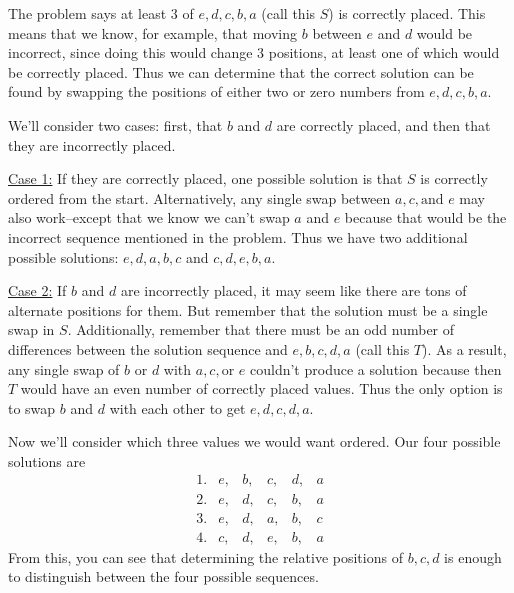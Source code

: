 \begin{solution}[C]
    The problem says at least $3$ of $e, d, c, b, a$ (call this $S$) is correctly placed. This means that we know, for example, that moving $b$ between $e$ and $d$ would be incorrect, since doing this would change 3 positions, at least one of which would be correctly placed. Thus we can determine that the correct solution can be found by swapping the positions of either two or zero numbers from $e, d, c, b, a$.

    We'll consider two cases: first, that $b$ and $d$ are correctly placed, and then that they are incorrectly placed.

    \underline{Case 1:} If they are correctly placed, one possible solution is that $S$ is correctly ordered from the start. Alternatively, any single swap between $a, c, \text{and } e$ may also work--except that we know we can't swap $a$ and $e$ because that would be the incorrect sequence mentioned in the problem. Thus we have two additional possible solutions: $e, d, a, b, c$ and $c, d, e, b, a$.

    \underline{Case 2:} If $b$ and $d$ are incorrectly placed, it may seem like there are tons of alternate positions for them. But remember that the solution must be a single swap in $S$. Additionally, remember that there must be an odd number of differences between the solution sequence and $e, b, c, d, a$ (call this $T$). As a result, any single swap of $b$ or $d$ with $a, c, \text{or } e$ couldn't produce a solution because then $T$ would have an even number of correctly placed values. Thus the only option is to swap $b$ and $d$ with each other to get $e, d, c, d, a$.

    Now we'll consider which three values we would want ordered. Our four possible solutions are 
    \[
    \begin{array}{cccccc}
    1. & e, & b, & c, & d, & a \\[1mm]
    2. & e, & d, & c, & b, & a \\[1mm]
    3. & e, & d, & a, & b, & c \\[1mm]
    4. & c, & d, & e, & b, & a
    \end{array}
    \]
    From this, you can see that determining the relative positions of $\boxed{b, c, d}$ is enough to distinguish between the four possible sequences. 
\end{solution}

